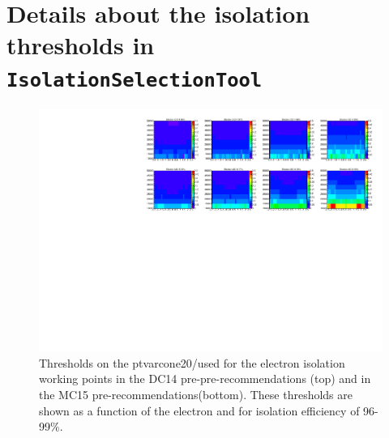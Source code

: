 \clearpage 
\section{Details about the isolation thresholds in {\tt IsolationSelectionTool}}
\label{app:iso}
 

\begin{figure}[phtb!]
\begin{center}
\includegraphics[width=\textwidth]{FIGURES/ISOLATION/Electron_ptvarcone20.pdf}
\end{center}
\vspace{-0.2cm}
\caption{Thresholds on the ptvarcone20/\pt used for the electron isolation working points in the DC14 pre-pre-recommendations (top) and in the MC15 pre-recommendations(bottom). These thresholds are shown as a function of the electron \pt and \eta for isolation efficiency of 96-99\%.}
\label{fig:isoThresholdsEleTrk}
\end{figure}


